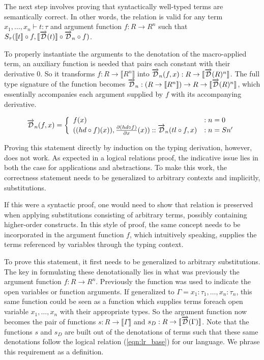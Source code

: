 \documentclass[11pt, final]{article}
\begin{document}
  The next step involves proving that syntactically well-typed terms are semantically correct.
  In other words, the relation is valid for any term $x_1, \dots, x_n \vdash t : \tau$ and argument function $f : R \rightarrow R^n$ such that $S_\tau(\llbracket t \rrbracket \circ f, \llbracket \overrightarrow{\mathcal{D}}(t) \rrbracket \circ \overrightarrow{\mathcal{D}}_n \circ f)$.

  To properly instantiate the arguments to the denotation of the macro-applied term, an auxiliary function is needed that pairs each constant with their derivative $0$. So it transforms $f : R \rightarrow \llbracket R^n \rrbracket$ into $\overrightarrow{\mathcal{D}}_n(f, x) : R \rightarrow \llbracket \overrightarrow{\mathcal{D}}(R)^n \rrbracket$.
  The full type signature of the function becomes $\overrightarrow{\mathcal{D}}_n : (R \rightarrow \llbracket R^n \rrbracket) \rightarrow R \rightarrow \llbracket \overrightarrow{\mathcal{D}}(R)^n \rrbracket$, which essentially accompanies each argument supplied by $f$ with its accompanying derivative.

  \begin{equation}
    \overrightarrow{\mathcal{D}}_n(f, x) =
      \left\{
        \begin{array}{ll}
          f(x) & : n = 0 \\
          ((hd \circ f)(x)), \frac{\partial{(hd \circ f)}}{\partial{x}}(x)) :: \overrightarrow{\mathcal{D}}_n(tl \circ f, x) & : n = S n' \\
        \end{array}
      \right.
  \label{eqn:argument_df}
  \end{equation}

  Proving this statement directly by induction on the typing derivation, however, does not work.
  As expected in a logical relations proof, the indicative issue lies in both the case for applications and abstractions.
  To make this work, the correctness statement needs to be generalized to arbitrary contexts and implicitly, substitutions.

  If this were a syntactic proof, one would need to show that relation is preserved when applying substitutions consisting of arbitrary terms, possibly containing higher-order constructs.
  In this style of proof, the same concept needs to be incorporated in the argument function $f$, which intuitively speaking, supplies the terms referenced by variables through the typing context.


  To prove this statement, it first needs to be generalized to arbitrary substitutions.
  The key in formulating these denotationally lies in what was previously the argument function $f : R \rightarrow R^n$.
  Previously the function was used to indicate the open variables or function arguments.
  If generalized to $\Gamma = x_1 : \tau_1, \dots, x_n : \tau_n$, this same function could be seen as a function which supplies terms foreach open variable $x_1, \dots, x_n$ with their appropriate types.
  So the argument function now becomes the pair of functions $s : R \rightarrow \llbracket \Gamma \rrbracket$ and $s_D : R \rightarrow \llbracket \overrightarrow{\mathcal{D}}(\Gamma) \rrbracket$.
  Note that the functions $s$ and $s_D$ are built out of the denotations of terms such that these same denotations follow the logical relation (\ref{eqn:lr_base}) for our language.
  We phrase this requirement as a definition.
\end{document}
